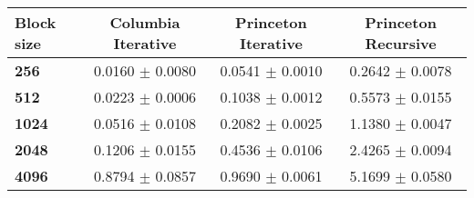 \begin{tabular}{lccc}\toprule
\textbf{Block size}  & \textbf{Columbia Iterative} & \textbf{Princeton Iterative} & \textbf{Princeton Recursive}\\\midrule
\textbf{256}  & 0.0160 $\pm$ 0.0080 & 0.0541 $\pm$ 0.0010 & 0.2642 $\pm$ 0.0078\\
\textbf{512}  & 0.0223 $\pm$ 0.0006 & 0.1038 $\pm$ 0.0012 & 0.5573 $\pm$ 0.0155\\
\textbf{1024}  & 0.0516 $\pm$ 0.0108 & 0.2082 $\pm$ 0.0025 & 1.1380 $\pm$ 0.0047\\
\textbf{2048}  & 0.1206 $\pm$ 0.0155 & 0.4536 $\pm$ 0.0106 & 2.4265 $\pm$ 0.0094\\
\textbf{4096} & 0.8794 $\pm$ 0.0857 & 0.9690 $\pm$ 0.0061 & 5.1699 $\pm$ 0.0580\\
\bottomrule
\end{tabular}
